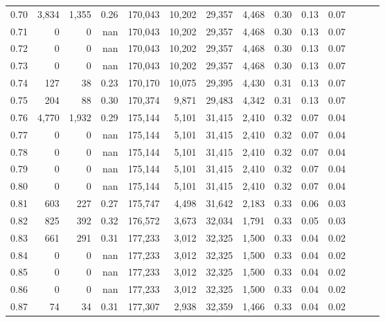 \begin{tabular}{rrrrrrrrrrrrrr}
0.70 &   3,834 &  1,355 &  0.26 &  170,043 &   10,202 &  29,357 &   4,468 &  0.30 &  0.13 &      0.07 \\
0.71 &       0 &      0 &   nan &  170,043 &   10,202 &  29,357 &   4,468 &  0.30 &  0.13 &      0.07 \\
0.72 &       0 &      0 &   nan &  170,043 &   10,202 &  29,357 &   4,468 &  0.30 &  0.13 &      0.07 \\
0.73 &       0 &      0 &   nan &  170,043 &   10,202 &  29,357 &   4,468 &  0.30 &  0.13 &      0.07 \\
0.74 &     127 &     38 &  0.23 &  170,170 &   10,075 &  29,395 &   4,430 &  0.31 &  0.13 &      0.07 \\
0.75 &     204 &     88 &  0.30 &  170,374 &    9,871 &  29,483 &   4,342 &  0.31 &  0.13 &      0.07 \\
0.76 &   4,770 &  1,932 &  0.29 &  175,144 &    5,101 &  31,415 &   2,410 &  0.32 &  0.07 &      0.04 \\
0.77 &       0 &      0 &   nan &  175,144 &    5,101 &  31,415 &   2,410 &  0.32 &  0.07 &      0.04 \\
0.78 &       0 &      0 &   nan &  175,144 &    5,101 &  31,415 &   2,410 &  0.32 &  0.07 &      0.04 \\
0.79 &       0 &      0 &   nan &  175,144 &    5,101 &  31,415 &   2,410 &  0.32 &  0.07 &      0.04 \\
0.80 &       0 &      0 &   nan &  175,144 &    5,101 &  31,415 &   2,410 &  0.32 &  0.07 &      0.04 \\
0.81 &     603 &    227 &  0.27 &  175,747 &    4,498 &  31,642 &   2,183 &  0.33 &  0.06 &      0.03 \\
0.82 &     825 &    392 &  0.32 &  176,572 &    3,673 &  32,034 &   1,791 &  0.33 &  0.05 &      0.03 \\
0.83 &     661 &    291 &  0.31 &  177,233 &    3,012 &  32,325 &   1,500 &  0.33 &  0.04 &      0.02 \\
0.84 &       0 &      0 &   nan &  177,233 &    3,012 &  32,325 &   1,500 &  0.33 &  0.04 &      0.02 \\
0.85 &       0 &      0 &   nan &  177,233 &    3,012 &  32,325 &   1,500 &  0.33 &  0.04 &      0.02 \\
0.86 &       0 &      0 &   nan &  177,233 &    3,012 &  32,325 &   1,500 &  0.33 &  0.04 &      0.02 \\
0.87 &      74 &     34 &  0.31 &  177,307 &    2,938 &  32,359 &   1,466 &  0.33 &  0.04 &      0.02 \\

\end{tabular}
